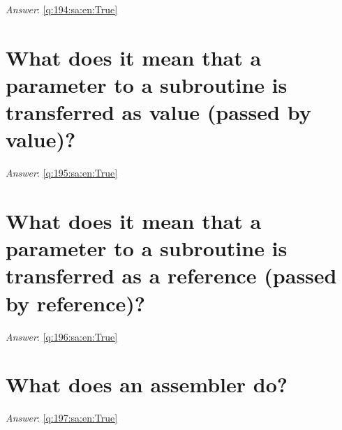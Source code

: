 \documentclass[a4paper,11pt,oneside]{book}
\begin{document}
\begin{sloppypar}
\label{q:194:sa:en:False}

\vspace{2cm}

\noindent\makebox[\textwidth]{\hrulefill}

\vspace{1cm}

\textit{Answer}: \autoref{q:194:sa:en:True}



\section{What does it mean that a parameter to a subroutine is transferred as value (passed by value)?}

\label{q:195:sa:en:False}

\vspace{2cm}

\noindent\makebox[\textwidth]{\hrulefill}

\vspace{1cm}

\textit{Answer}: \autoref{q:195:sa:en:True}



\section{What does it mean that a parameter to a subroutine is transferred as a reference (passed by reference)?}

\label{q:196:sa:en:False}

\vspace{2cm}

\noindent\makebox[\textwidth]{\hrulefill}

\vspace{1cm}

\textit{Answer}: \autoref{q:196:sa:en:True}



\section{What does an assembler do?}

\label{q:197:sa:en:False}

\vspace{2cm}

\noindent\makebox[\textwidth]{\hrulefill}

\vspace{1cm}

\textit{Answer}: \autoref{q:197:sa:en:True}




\end{sloppypar}
\end{document}
